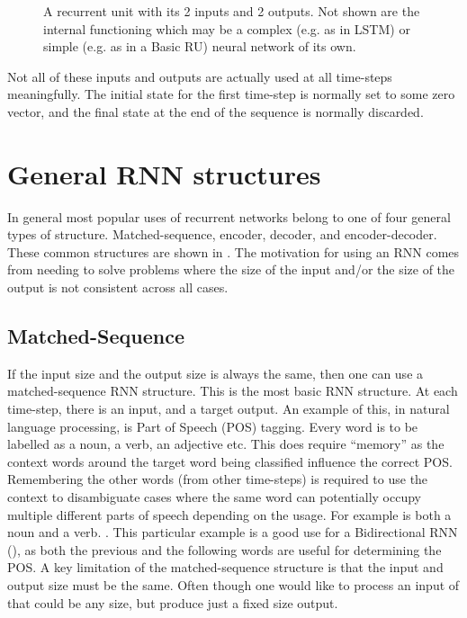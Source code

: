\documentclass[12pt,parskip]{komatufte}
\begin{document}
\begin{figure}
	\caption{A recurrent unit with its 2 inputs and 2 outputs. Not shown are the internal functioning which may be a complex (e.g. as in LSTM) or simple (e.g. as in a Basic RU) neural network of its own.}
	\label{fig-ru}
	\centering
		
			
\end{figure}

Not all of these inputs and outputs are actually used at all time-steps meaningfully.
The initial state for the first time-step is normally set to some zero vector,
and the final state at the end of the sequence is normally discarded.


\section{General RNN structures}
In general most popular uses of recurrent networks belong to one of four general types of structure.
Matched-sequence, encoder, decoder, and encoder-decoder.
These common structures are shown in .
The motivation for using an RNN comes from needing to solve problems where the size of the input and/or the size of the output is not consistent across all cases.

\subsection{Matched-Sequence}
If the input size and the output size is always the same, then one can use a matched-sequence RNN structure.
This is the most basic RNN structure.
At each time-step, there is an input, and a target output.
An example of this, in natural language processing, is Part of Speech (POS) tagging.
Every word is to be labelled as a noun, a verb, an adjective etc.
This does require ``memory'' as the context words around the target word being classified influence the correct POS.
Remembering the other words (from other time-steps) is required to use the context to disambiguate cases where the same word can potentially occupy multiple different parts of speech depending on the usage.
For example  is both a noun and a verb.%
.%
This particular example is a good use for a Bidirectional RNN (), as both the previous and the following words are useful for determining the POS.
A key limitation of the matched-sequence structure is that the input and output size must be the same.
Often though one would like to process an input of that could be any size, but produce just a fixed size output.
\end{document}
